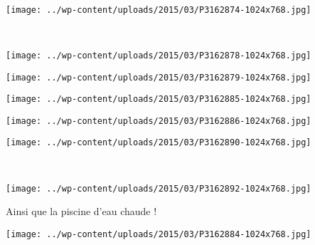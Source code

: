 \pagebreak
~\\
\begin{center} \texttt{[image: ../wp-content/uploads/2015/03/P3162874-1024x768.jpg]} \end{center}
~
\begin{center} \texttt{[image: ../wp-content/uploads/2015/03/P3162878-1024x768.jpg]} \end{center}
\begin{center} \texttt{[image: ../wp-content/uploads/2015/03/P3162879-1024x768.jpg]} \end{center}
\begin{center} \texttt{[image: ../wp-content/uploads/2015/03/P3162885-1024x768.jpg]} \end{center}
\begin{center} \texttt{[image: ../wp-content/uploads/2015/03/P3162886-1024x768.jpg]} \end{center}
\vfill
\begin{center} \texttt{[image: ../wp-content/uploads/2015/03/P3162890-1024x768.jpg]} \end{center}
\vspace{-\topsep}
\vspace{-0.75mm}
\pagebreak
~\\
\vspace{1mm}
\begin{center} \texttt{[image: ../wp-content/uploads/2015/03/P3162892-1024x768.jpg]} \end{center}

 Ainsi que la piscine d'eau chaude ! 
\begin{center} \texttt{[image: ../wp-content/uploads/2015/03/P3162884-1024x768.jpg]} \end{center}
\vspace{-\topsep}

